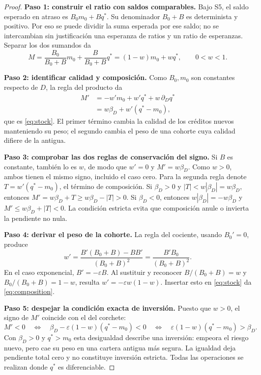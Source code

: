 \documentclass[11pt]{article}
\theoremstyle{definition}\newtheorem{assumption}{Supuesto}
\begin{document}
\begin{proof}
\textbf{Paso 1: construir el ratio con saldos comparables.}
Bajo S5, el saldo esperado en atraso es $B_0m_0+Bq^*$. Su denominador
$B_0+B$ es determinista y positivo. Por eso se puede dividir la suma esperada
por ese saldo; no se intercambian sin justificación una esperanza de ratios
y un ratio de esperanzas. Separar los dos sumandos da
\[
M=\frac{B_0}{B_0+B}m_0+\frac{B}{B_0+B}q^*
  =(1-w)m_0+wq^*,\qquad 0<w<1.
\]

\textbf{Paso 2: identificar calidad y composición.}
Como $B_0,m_0$ son constantes respecto de $D$, la regla del producto da
\begin{align*}
M'&=-w'm_0+w'q^*+w\,\partial_Dq^*\\
  &=w\beta_D+w'(q^*-m_0),
\end{align*}
que es \eqref{eq:stock}. El primer término cambia la calidad de los créditos
nuevos manteniendo su peso; el segundo cambia el peso de una cohorte cuya
calidad difiere de la antigua.

\textbf{Paso 3: comprobar las dos reglas de conservación del signo.}
Si $B$ es constante, también lo es $w$, de modo que $w'=0$ y
$M'=w\beta_D$. Como $w>0$, ambos tienen el mismo signo, incluido el caso cero.
Para la segunda regla denote $T=w'(q^*-m_0)$, el término de composición.
Si $\beta_D>0$ y $|T|<w|\beta_D|=w\beta_D$, entonces
$M'=w\beta_D+T\ge w\beta_D-|T|>0$. Si $\beta_D<0$, entonces
$w|\beta_D|=-w\beta_D$ y
$M'\le w\beta_D+|T|<0$. La condición estricta evita que composición
anule o invierta la pendiente no nula.

\textbf{Paso 4: derivar el peso de la cohorte.}
La regla del cociente, usando $B_0'=0$, produce
\[
w'=\frac{B'(B_0+B)-BB'}{(B_0+B)^2}
   =\frac{B'B_0}{(B_0+B)^2}.
\]
En el caso exponencial, $B'= -\varepsilon B$. Al sustituir y reconocer
$B/(B_0+B)=w$ y $B_0/(B_0+B)=1-w$, resulta
$w'=-\varepsilon w(1-w)$. Insertar esto en \eqref{eq:stock} da
\eqref{eq:composition}.

\textbf{Paso 5: despejar la condición exacta de inversión.}
Puesto que $w>0$, el signo de $M'$ coincide con el del corchete:
\[
M'<0\quad\Longleftrightarrow\quad
\beta_D-\varepsilon(1-w)(q^*-m_0)<0
\quad\Longleftrightarrow\quad
\varepsilon(1-w)(q^*-m_0)>\beta_D.
\]
Con $\beta_D>0$ y $q^*>m_0$ esta desigualdad describe una inversión: empeora
el riesgo nuevo, pero cae su peso en una cartera antigua más segura. La
igualdad deja pendiente total cero y no constituye inversión estricta.
Todas las operaciones se realizan donde $q^*$ es diferenciable.
\end{proof}
\end{document}
